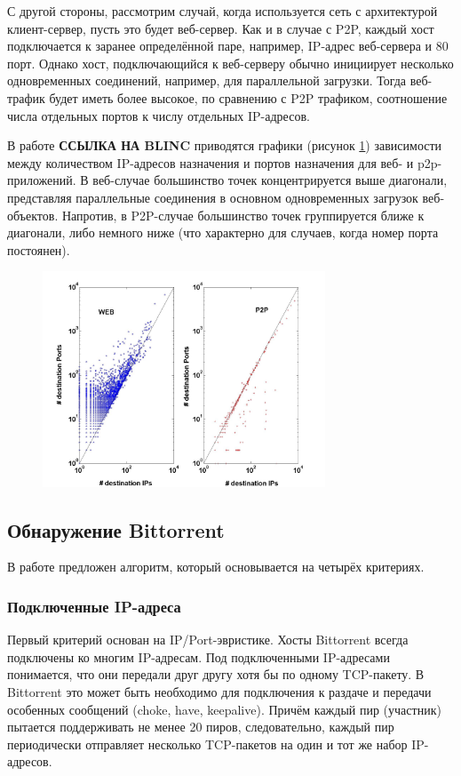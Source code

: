 \documentclass[bachelor, och, coursework]{SCWorks}
\begin{document}
С другой стороны, рассмотрим случай, когда используется сеть с архитектурой клиент-сервер, пусть это будет веб-сервер. Как и в случае с P2P, каждый хост подключается к заранее определённой паре, например, IP-адрес веб-сервера и 80 порт. Однако хост, подключающийся к веб-серверу обычно инициирует несколько одновременных соединений, например, для параллельной загрузки. Тогда веб-трафик будет иметь более высокое, по сравнению с P2P трафиком, соотношение числа отдельных портов к числу отдельных IP-адресов.

В работе \textbf{ССЫЛКА НА BLINC} приводятся графики (рисунок \ref{IPPort4.jpg}) зависимости между количеством IP-адресов назначения и портов назначения для веб- и p2p-приложений. В веб-случае большинство точек концентрируется выше диагонали, представляя параллельные соединения в основном одновременных загрузок веб-объектов. Напротив, в P2P-случае большинство точек группируется ближе к диагонали, либо немного ниже (что характерно для случаев, когда номер порта постоянен).

\begin{figure}[H]
    \centering
    \includegraphics[width=0.75\textwidth]{IPPort4.jpg}
    \caption{}
    \label{IPPort4.jpg}
\end{figure}

\subsection{Обнаружение Bittorrent}
В работе \cite{bittorrent} предложен алгоритм, который основывается на четырёх критериях.

\subsubsection{Подключенные IP-адреса}
Первый критерий основан на IP/Port-эвристике. Хосты Bittorrent всегда подключены ко многим IP-адресам.
Под подключенными IP-адресами понимается, что они передали друг другу хотя бы
по одному TCP-пакету. В Bittorrent это может быть необходимо для подключения к раздаче и передачи особенных
сообщений (choke, have, keepalive). Причём каждый пир (участник) пытается поддерживать не менее 20 пиров, следовательно,
каждый пир периодически отправляет несколько TCP-пакетов на один и тот же набор IP-адресов.
\end{document}
